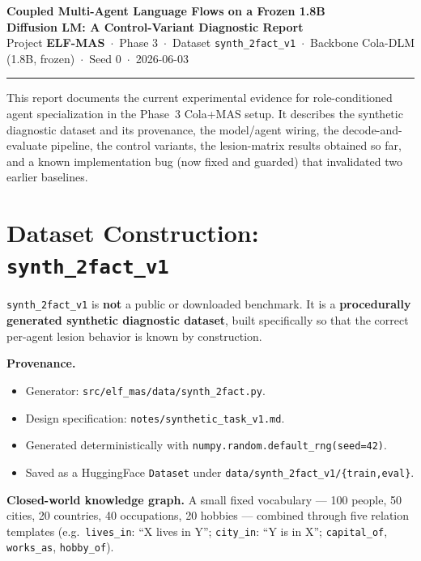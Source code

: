 \documentclass[10pt]{article}
\begin{document}
\begin{center}
{\Large\bfseries Coupled Multi-Agent Language Flows on a Frozen 1.8B\\[2pt]
Diffusion LM: A Control-Variant Diagnostic Report}\\[6pt]
{\small Project \textbf{ELF-MAS} \,$\cdot$\, Phase 3 \,$\cdot$\, Dataset \texttt{synth\_2fact\_v1}
\,$\cdot$\, Backbone Cola-DLM (1.8B, frozen) \,$\cdot$\, Seed 0 \,$\cdot$\, 2026-06-03}
\end{center}
\vspace{2pt}
\hrule
\vspace{6pt}

This report documents the current experimental evidence for role-conditioned agent
specialization in the Phase~3 Cola+MAS setup. It describes the synthetic diagnostic
dataset and its provenance, the model/agent wiring, the decode-and-evaluate pipeline, the
control variants, the lesion-matrix results obtained so far, and a known implementation
bug (now fixed and guarded) that invalidated two earlier baselines.

\section{Dataset Construction: \texttt{synth\_2fact\_v1}}
\texttt{synth\_2fact\_v1} is \textbf{not} a public or downloaded benchmark. It is a
\textbf{procedurally generated synthetic diagnostic dataset}, built specifically so that
the correct per-agent lesion behavior is known by construction.

\noindent\textbf{Provenance.}
\begin{itemize}
\item Generator: \texttt{src/elf\_mas/data/synth\_2fact.py}.
\item Design specification: \texttt{notes/synthetic\_task\_v1.md}.
\item Generated deterministically with \texttt{numpy.random.default\_rng(seed=42)}.
\item Saved as a HuggingFace \texttt{Dataset} under \texttt{data/synth\_2fact\_v1/\{train,eval\}}.
\end{itemize}

\noindent\textbf{Closed-world knowledge graph.} A small fixed vocabulary --- 100 people,
50 cities, 20 countries, 40 occupations, 20 hobbies --- combined through five relation
templates (e.g.\ \texttt{lives\_in}: ``X lives in Y''; \texttt{city\_in}: ``Y is in X'';
\texttt{capital\_of}, \texttt{works\_as}, \texttt{hobby\_of}).
\end{document}

